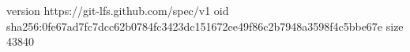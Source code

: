 version https://git-lfs.github.com/spec/v1
oid sha256:0fe67ad7fc7dcc62b0784fc3423dc151672ee49f86c2b7948a3598f4c5bbe67e
size 43840
